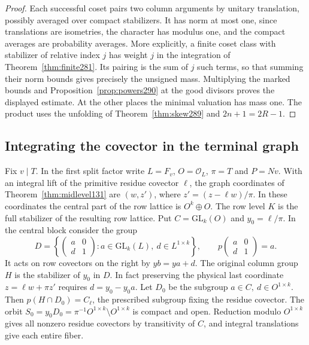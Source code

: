 \documentclass[a4paper,11pt]{article}
\theoremstyle{definition}
\theoremstyle{remark}
\numberwithin{equation}{section}
\begin{document}
\begin{proof}
Each successful coset pairs two column arguments by unitary
translation, possibly averaged over compact stabilizers.
It has norm at most one, since translations are isometries,
the character has modulus one, and the compact averages are
probability averages. More explicitly, a finite coset class
with stabilizer of relative index \(j\) has weight \(j\)
in the integration of Theorem~\ref{thm:finite281}. Its
pairing is the sum of \(j\) such terms, so that summing
their norm bounds gives precisely the unsigned mass.
Multiplying the marked bounds and
Proposition~\ref{prop:powers290} at the good divisors proves
the displayed estimate. At the other places the minimal
valuation has mass one. The product uses the unfolding of
Theorem~\ref{thm:skew289} and \(2n+1=2R-1\).
\end{proof}

\subsection{Integrating the covector in the terminal graph}\label{nav:II-64}
Fix \(v\mid T\). In the first split factor write \(L=F_v\),
\(O=\mathcal O_L\), \(\pi=T\) and \(P=Nv\). With an integral
lift of the primitive residue covector \(\ell\), the graph
coordinates of Theorem~\ref{thm:midlevel131} are
\((w,z')\), where \(z'=(z-\ell w)/\pi\). In these coordinates
the central part of the row lattice is \(O^k\oplus O\).
The row level \(K\) is the full stabilizer of the resulting
row lattice. Put \(C=\mathrm{GL}_k(O)\) and \(y_0=\ell/\pi\).
In the central block consider the group
\[
 D=\left\{\begin{pmatrix}a&0\\ d&1\end{pmatrix}
        :a\in\mathrm{GL}_k(L),\ d\in L^{1\times k}\right\},
 \qquad p\left(\begin{smallmatrix}a&0\\d&1\end{smallmatrix}\right)=a.
\]
It acts on row covectors on the right by \(y b=ya+d\).
The original column group \(H\) is the stabilizer of \(y_0\)
in \(D\). In fact preserving the physical last coordinate
\(z=\ell w+\pi z'\) requires \(d=y_0-y_0a\).
Let \(D_0\) be the subgroup \(a\in C,\ d\in O^{1\times k}\).
Then \(p(H\cap D_0)=C_\ell\), the prescribed subgroup
fixing the residue covector. The orbit
\(S_0=y_0D_0=\pi^{-1}O^{1\times k}\setminus O^{1\times k}\)
is compact and open. Reduction modulo \(O^{1\times k}\)
gives all nonzero residue covectors by transitivity of
\(C\), and integral translations give each entire fiber.
\end{document}
